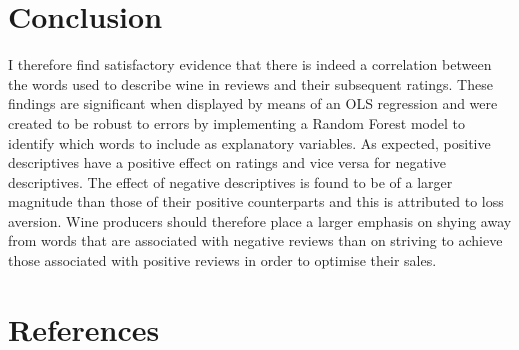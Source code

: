 \documentclass[11pt,preprint]{elsarticle}
\numberwithin{equation}{section}
\numberwithin{figure}{section}
\numberwithin{table}{section}
\begin{document}
\newpage

\section{Conclusion}\label{conclusion}

\label{Concl} I therefore find satisfactory evidence that there is
indeed a correlation between the words used to describe wine in reviews
and their subsequent ratings. These findings are significant when
displayed by means of an OLS regression and were created to be robust to
errors by implementing a Random Forest model to identify which words to
include as explanatory variables. As expected, positive descriptives
have a positive effect on ratings and vice versa for negative
descriptives. The effect of negative descriptives is found to be of a
larger magnitude than those of their positive counterparts and this is
attributed to loss aversion. Wine producers should therefore place a
larger emphasis on shying away from words that are associated with
negative reviews than on striving to achieve those associated with
positive reviews in order to optimise their sales.

\newpage

\section*{References}\label{references}
\end{document}
